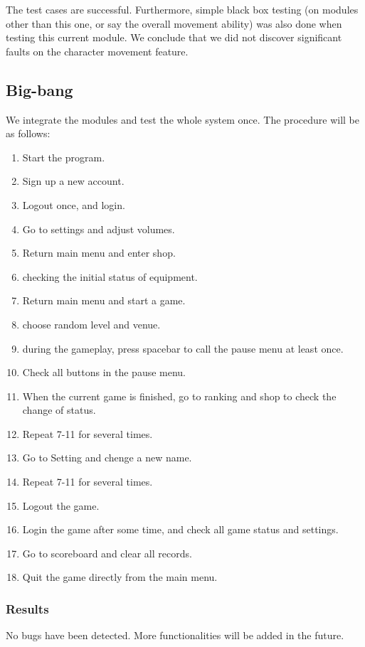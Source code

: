 \documentclass[11pt]{article}
\begin{document}
    The test cases are successful. Furthermore, simple black box testing (on modules other than this one, or say the overall movement ability) was also done when testing this current module. We conclude that we did not discover significant faults on the character movement feature.
    
    \subsection{Big-bang}

    We integrate the modules and test the whole system once. The procedure will be as follows:

    \begin{enumerate}
        \item Start the program.
        \item Sign up a new account.
        \item Logout once, and login.
        \item Go to settings and adjust volumes.
        \item Return main menu and enter shop.
        \item checking the initial status of equipment.
        \item Return main menu and start a game.
        \item choose random level and venue.
        \item during the gameplay, press spacebar to call the pause menu at least once.
        \item Check all buttons in the pause menu.
        \item When the current game is finished, go to ranking and shop to check the change of status.
        \item Repeat 7-11 for several times.
        \item Go to Setting and chenge a new name.
        \item Repeat 7-11 for several times.
        \item Logout the game.
        \item Login the game after some time, and check all game status and settings.
        \item Go to scoreboard and clear all records.
        \item Quit the game directly from the main menu.
    \end{enumerate}

    \subsubsection*{Results}

    No bugs have been detected. More functionalities will be added in the future.
\end{document}
